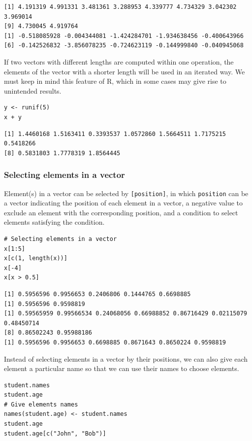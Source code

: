 \documentclass[a4paper,11pt]{article}
\begin{document}
\begin{verbatim}
[1] 4.191319 4.991331 3.481361 3.288953 4.339777 4.734329 3.042302 3.969014
[9] 4.730045 4.919764
[1] -0.518085928 -0.004344081 -1.424284701 -1.934638456 -0.400643966
[6] -0.142526832 -3.856078235 -0.724623119 -0.144999840 -0.040945068
\end{verbatim}

If two vectors with different lengths are computed within one
operation, the elements of the vector with a shorter length will be
used in an iterated way. We must keep in mind this feature of R, which
in some cases may give rise to unintended results.

\begin{verbatim}
y <- runif(5)
x + y
\end{verbatim}

\begin{verbatim}
[1] 1.4460168 1.5163411 0.3393537 1.0572860 1.5664511 1.7175215 0.5418266
[8] 0.5831803 1.7778319 1.8564445
\end{verbatim}

\subsubsection*{Selecting elements in a vector}
\label{sec:org295b3de}

Element(s) in a vector can be selected by \texttt{[position]}, in which
\texttt{position} can be a vector indicating the position of each element in
a vector, a negative value to exclude an element with the
corresponding position, and a condition to select elements satisfying
the condition.

\begin{verbatim}
# Selecting elements in a vector
x[1:5]
x[c(1, length(x))]
x[-4]
x[x > 0.5]
\end{verbatim}

\begin{verbatim}
[1] 0.5956596 0.9956653 0.2406806 0.1444765 0.6698885
[1] 0.5956596 0.9598819
[1] 0.59565959 0.99566534 0.24068056 0.66988852 0.86716429 0.02115079 0.48450714
[8] 0.86502243 0.95988186
[1] 0.5956596 0.9956653 0.6698885 0.8671643 0.8650224 0.9598819
\end{verbatim}

Instead of selecting elements in a vector by their positions, we can
also give each element a particular name so that we can use their
names to choose elements.

\begin{verbatim}
student.names
student.age
# Give elements names
names(student.age) <- student.names
student.age
student.age[c("John", "Bob")]
\end{verbatim}
\end{document}
